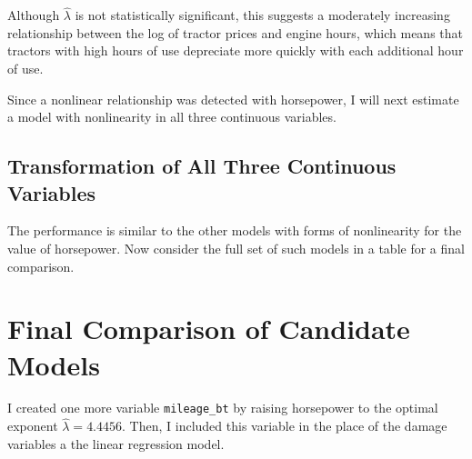 \documentclass[11pt]{paper}
\begin{document}


Although $\hat{\lambda}$ is not statistically significant,
this suggests a moderately increasing relationship
between the log of tractor prices and engine hours,
which means that tractors with high hours of use
depreciate more quickly with each additional hour of use.

Since a nonlinear relationship was detected with horsepower,
I will next estimate a model
with nonlinearity in all three continuous variables.


\subsection{Transformation of All Three Continuous Variables}





The performance is similar to the other models with
forms of nonlinearity for the value of horsepower.
Now consider the full set of such models in a table for a final comparison.


\pagebreak
\section{Final Comparison of Candidate Models}

I created one more variable \texttt{mileage\_bt}
by raising horsepower to the optimal exponent 
$\hat{\lambda} =4.4456$. 
Then, I included this variable in the place of 
the damage variables a the linear regression model.
% 

% 






\end{document}
